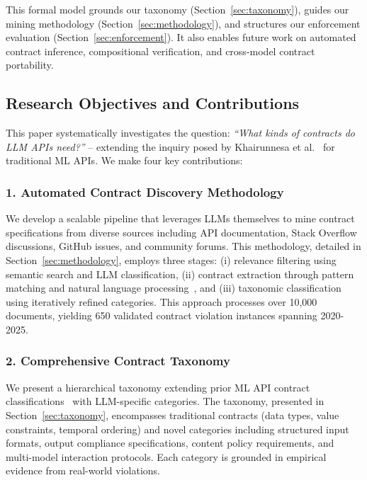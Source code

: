 \documentclass[11pt]{article}
\begin{document}
This formal model grounds our taxonomy (Section~\ref{sec:taxonomy}), guides our mining methodology (Section~\ref{sec:methodology}), and structures our enforcement evaluation (Section~\ref{sec:enforcement}). It also enables future work on automated contract inference, compositional verification, and cross-model contract portability.

\subsection{Research Objectives and Contributions}

This paper systematically investigates the question: \textit{``What kinds of contracts do LLM APIs need?''} -- extending the inquiry posed by Khairunnesa et al.~\cite{khairunnesa2023} for traditional ML APIs. We make four key contributions:

\subsubsection{1. Automated Contract Discovery Methodology}
We develop a scalable pipeline that leverages LLMs themselves to mine contract specifications from diverse sources including API documentation, Stack Overflow discussions, GitHub issues, and community forums. This methodology, detailed in Section~\ref{sec:methodology}, employs three stages: (i) relevance filtering using semantic search and LLM classification, (ii) contract extraction through pattern matching and natural language processing~\cite{pandita2012inferring}, and (iii) taxonomic classification using iteratively refined categories. This approach processes over 10,000 documents, yielding 650 validated contract violation instances spanning 2020-2025.

\subsubsection{2. Comprehensive Contract Taxonomy}
We present a hierarchical taxonomy extending prior ML API contract classifications~\cite{khairunnesa2023} with LLM-specific categories. The taxonomy, presented in Section~\ref{sec:taxonomy}, encompasses traditional contracts (data types, value constraints, temporal ordering) and novel categories including structured input formats, output compliance specifications, content policy requirements, and multi-model interaction protocols. Each category is grounded in empirical evidence from real-world violations.
\end{document}
